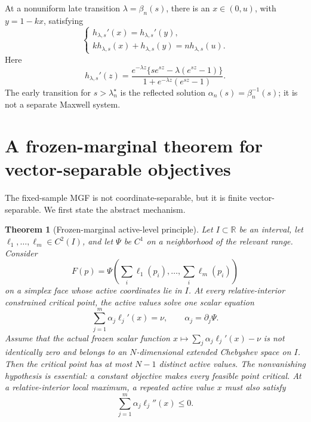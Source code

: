 \documentclass[11pt]{article}
\theoremstyle{plain}
\newtheorem{theorem}{Theorem}[section]
\theoremstyle{definition}
\theoremstyle{remark}
\newcommand{\R}{\mathbb R}
\begin{document}
At a nonuniform late transition \(\lambda=\beta_n(s)\), there is an \(x\in(0,u)\), with \(y=1-kx\), satisfying
\begin{equation}\label{eq:transition-system-new}
\begin{cases}
 h_{\lambda,s}'(x)=h_{\lambda,s}'(y),\\
 kh_{\lambda,s}(x)+h_{\lambda,s}(y)=nh_{\lambda,s}(u).
\end{cases}
\end{equation}
Here
\begin{equation}\label{eq:hprime-new}
h_{\lambda,s}'(z)
=\frac{e^{-\lambda z}\{s e^{sz}-\lambda(e^{sz}-1)\}}
{1+e^{-\lambda z}(e^{sz}-1)}.
\end{equation}
The early transition for \(s>\lambda_n^\star\) is the reflected solution \(\alpha_n(s)=\beta_n^{-1}(s)\); it is not a separate Maxwell system.

\section{A frozen-marginal theorem for vector-separable objectives}

The fixed-sample MGF is not coordinate-separable, but it is finite vector-separable.  We first state the abstract mechanism.

\begin{theorem}[Frozen-marginal active-level principle]\label{thm:frozen-abstract}
Let \(I\subset\R\) be an interval, let \(\ell_1,\ldots,\ell_m\in C^2(I)\), and let \(\Psi\) be \(C^1\) on a neighborhood of the relevant range.  Consider
\[
F(p)=\Psi\left(\sum_i\ell_1(p_i),\ldots,\sum_i\ell_m(p_i)\right)
\]
on a simplex face whose active coordinates lie in \(I\).  At every relative-interior constrained critical point, the active values solve one scalar equation
\begin{equation}\label{eq:frozen-abstract-equation}
\sum_{j=1}^m\alpha_j\ell_j'(x)=\nu,
\qquad
\alpha_j=\partial_j\Psi.
\end{equation}
Assume that the actual frozen scalar function \(x\mapsto\sum_j\alpha_j\ell_j'(x)-\nu\) is not identically zero and belongs to an \(N\)-dimensional extended Chebyshev space on \(I\).  Then the critical point has at most \(N-1\) distinct active values.  The nonvanishing hypothesis is essential: a constant objective makes every feasible point critical.  At a relative-interior local maximum, a repeated active value \(x\) must also satisfy
\begin{equation}\label{eq:frozen-concavity}
\sum_{j=1}^m\alpha_j\ell_j''(x)\le0.
\end{equation}
\end{theorem}
\end{document}
